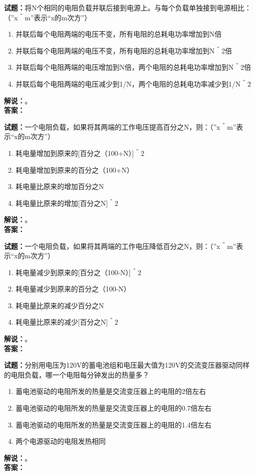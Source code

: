\documentclass{ctexbook}
\begin{document}
\bigskip

\noindent\textbf{试题：}将N个相同的电阻负载并联后接到电源上。与每个负载单独接到电源相比：（”x＾m”表示“x的m次方”）
\begin{enumerate}[leftmargin=3em]
  \item 并联后每个电阻两端的电压不变，所有电阻的总耗电功率增加到N倍
  \item 并联后每个电阻两端的电压不变，所有电阻的总耗电功率增加到N＾2倍
  \item 并联后每个电阻两端的电压增加到N倍，两个电阻的总耗电功率增加到N＾2倍
  \item 并联后每个电阻两端的电压减少到1/N，两个电阻的总耗电功率减少到1/N＾2
\end{enumerate}
\noindent\textbf{解说：}\textbf{}。\\\noindent\textbf{答案：}

\bigskip

\noindent\textbf{试题：}一个电阻负载，如果将其两端的工作电压提高百分之N，则：（”x＾m”表示“x的m次方”）
\begin{enumerate}[leftmargin=3em]
  \item 耗电量增加到原来的[百分之（100+N）]＾2
  \item 耗电量增加到原来的百分之（100+N）
  \item 耗电量比原来的增加百分之N
  \item 耗电量比原来的增加[百分之N]＾2
\end{enumerate}
\noindent\textbf{解说：}\textbf{}。\\\noindent\textbf{答案：}

\bigskip

\noindent\textbf{试题：}一个电阻负载，如果将其两端的工作电压降低百分之N，则：（”x＾m”表示“x的m次方”）
\begin{enumerate}[leftmargin=3em]
  \item 耗电量减少到原来的[百分之（100-N）]＾2
  \item 耗电量减少到原来的百分之（100-N）
  \item 耗电量比原来的减少百分之N
  \item 耗电量比原来的减少[百分之N]＾2
\end{enumerate}
\noindent\textbf{解说：}\textbf{}。\\\noindent\textbf{答案：}

\bigskip

\noindent\textbf{试题：}分别用电压为120V的蓄电池组和电压最大值为120V的交流变压器驱动同样的电阻负载，哪一个电阻每分钟发出的热量多？
\begin{enumerate}[leftmargin=3em]
  \item 蓄电池驱动的电阻所发的热量是交流变压器上的电阻的2倍左右
  \item 蓄电池驱动的电阻所发的热量是交流变压器上的电阻的0.7倍左右
  \item 蓄电池驱动的电阻所发的热量是交流变压器上的电阻的1.4倍左右
  \item 两个电源驱动的电阻发热相同
\end{enumerate}
\noindent\textbf{解说：}\textbf{}。\\\noindent\textbf{答案：}
\end{document}
